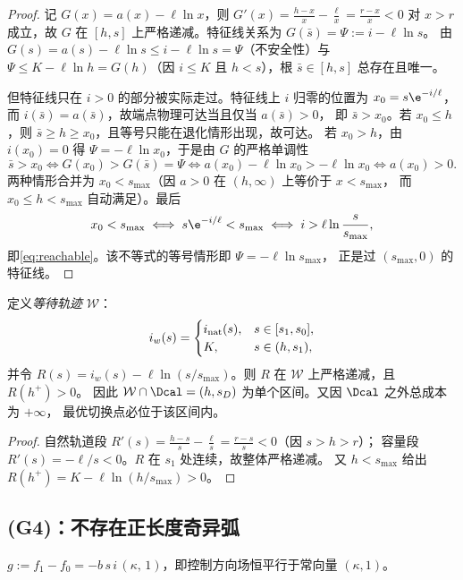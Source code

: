 \begin{proof}
记 $G(x)=a(x)-\ell\ln x$，则 $G'(x)=\frac{h-x}{x}-\frac{\ell}{x}=\frac{r-x}{x}<0$
对 $x>r$ 成立，故 $G$ 在 $[h,s]$ 上严格递减。特征线关系为 $G(\bar s)=\Psi:=i-\ell\ln s$。
由 $G(s)=a(s)-\ell\ln s\le i-\ell\ln s=\Psi$（不安全性）与
$\Psi\le K-\ell\ln h=G(h)$（因 $i\le K$ 且 $h<s$），根 $\bar s\in[h,s]$ 总存在且唯一。

但特征线只在 $i>0$ 的部分被实际走过。特征线上 $i$ 归零的位置为
$x_0=s\e^{-i/\ell}$，而 $i(\bar s)=a(\bar s)$，故端点物理可达当且仅当 $a(\bar s)>0$，
即 $\bar s>x_0$。若 $x_0\le h$，则 $\bar s\ge h\ge x_0$，且等号只能在退化情形出现，故可达。
若 $x_0>h$，由 $i(x_0)=0$ 得 $\Psi=-\ell\ln x_0$，于是由 $G$ 的严格单调性
\[
\bar s>x_0\iff G(x_0)>G(\bar s)=\Psi\iff a(x_0)-\ell\ln x_0>-\ell\ln x_0\iff a(x_0)>0 .
\]
两种情形合并为 $x_0<s_{\max}$（因 $a>0$ 在 $(h,\infty)$ 上等价于 $x<s_{\max}$，
而 $x_0\le h<s_{\max}$ 自动满足）。最后
\[
x_0<s_{\max}\iff s\e^{-i/\ell}<s_{\max}\iff i>\ell\ln\frac{s}{s_{\max}},
\]
即\eqref{eq:reachable}。该不等式的等号情形即 $\Psi=-\ell\ln s_{\max}$，
正是过 $(s_{\max},0)$ 的特征线。
\end{proof}

\begin{proposition}[等待轨迹与可达域相交于单个区间]
\label{prop:wait-interval}
定义\emph{等待轨迹} $\mathcal W$：
\[
i_w(s)=\begin{cases}
i_{\rm nat}(s), & s\in[s_1,s_0],\\
K, & s\in(h,s_1),
\end{cases}
\]
并令 $R(s)=i_w(s)-\ell\ln(s/s_{\max})$。则 $R$ 在 $\mathcal W$ 上严格递减，且 $R(h^+)>0$。
因此 $\mathcal W\cap\Dcal=(h,s_D)$ 为单个区间。又因 $\Dcal$ 之外总成本为 $+\infty$，
最优切换点必位于该区间内。
\end{proposition}

\begin{proof}
自然轨道段 $R'(s)=\frac{h-s}{s}-\frac{\ell}{s}=\frac{r-s}{s}<0$（因 $s>h>r$）；
容量段 $R'(s)=-\ell/s<0$。$R$ 在 $s_1$ 处连续，故整体严格递减。
又 $h<s_{\max}$ 给出 $R(h^+)=K-\ell\ln(h/s_{\max})>0$。
\end{proof}

\subsection{(G4)：不存在正长度奇异弧}
\label{sec:G4}

\begin{lemma}[控制方向的固定性]
\label{lem:fixed-direction}
$g:=f_1-f_0=-b\,s\,i\,(\kappa,\,1)$，即控制方向场恒平行于常向量 $(\kappa,1)$。
\end{lemma}


